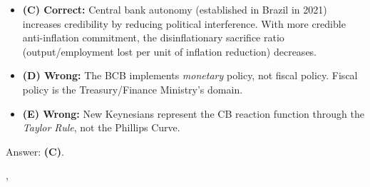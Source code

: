 {{\begin{itemize}
      \item \textbf{(C) Correct:} Central bank autonomy (established
            in Brazil in 2021) increases credibility by reducing political
            interference. With more credible anti-inflation commitment,
            the disinflationary sacrifice ratio (output/employment lost
            per unit of inflation reduction) decreases.
      \item \textbf{(D) Wrong:} The BCB implements \emph{monetary} policy,
            not fiscal policy. Fiscal policy is the Treasury/Finance
            Ministry's domain.
      \item \textbf{(E) Wrong:} New Keynesians represent the CB reaction
            function through the \emph{Taylor Rule}, not the Phillips Curve.
    \end{itemize}
    Answer: \textbf{(C)}.
  },
}
